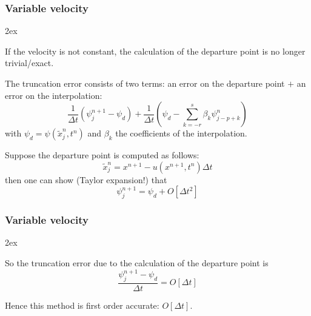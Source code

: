 \documentclass[aspectratio=149,9pt]{beamer}
\begin{document}
%
%
\begin{frame}
	\frametitle{Variable velocity}
	\begin{myitemize}{2ex}
		\item If the velocity is not constant, the calculation of the departure point is no longer trivial/exact.
		\item The truncation error consists of two terms: an error on the departure point $+$ an error on the interpolation:\vspace*{-1pt}
			\begin{equation*}
				\frac{1}{\Delta t}\left(\psi_j^{n+1} - \psi_d\right) + \frac{1}{\Delta t} \left( \psi_d - \sum_{k=-r}^s \beta_k \psi_{j-p+k}^n\right)
			\end{equation*}
			with $\psi_d = \psi (\tilde x_j^n, t^n)$ and $\beta_k$ the coefficients of the interpolation.
		\item Suppose the departure point is computed as follows:
			\begin{equation*}
				\tilde x_j^n = x^{n+1} - u(x^{n+1}, t^n ) \Delta t
			\end{equation*}
			then one can show (Taylor expansion!) that
			\begin{equation*}
				\psi_j^{n+1} = \psi_d + O [ \Delta t^2 ]
			\end{equation*}
	\end{myitemize}
\end{frame}
%
%
\begin{frame}
	\frametitle{Variable velocity}
	\begin{myitemize}{2ex}
		\item So the truncation error due to the calculation of the departure point is
			\begin{equation*}
				\frac{\psi_j^{n+1} - \psi_d}{\Delta t} = O [ \Delta t ]
			\end{equation*}
		\item Hence this method is first order accurate: $O [ \Delta t ]$.
	\end{myitemize}
\end{frame}
%
%
\end{document}
